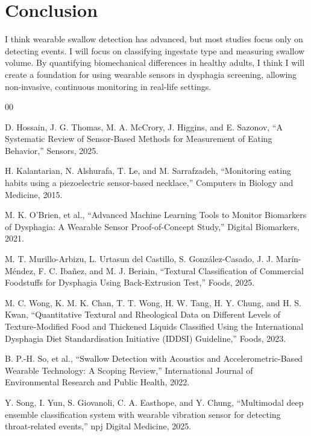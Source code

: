 \documentclass[conference]{IEEEtran}
\begin{document}
\section{Conclusion}
I think wearable swallow detection has advanced, but most studies focus only on detecting events. I will focus on classifying ingestate type and measuring swallow volume. By quantifying biomechanical differences in healthy adults, I think I will create a foundation for using wearable sensors in dysphagia screening, allowing non-invasive, continuous monitoring in real-life settings.

\begin{thebibliography}{00}

D. Hossain, J. G. Thomas, M. A. McCrory, J. Higgins, and E. Sazonov, “A Systematic Review of Sensor-Based Methods for Measurement of Eating Behavior,” Sensors, 2025.

H. Kalantarian, N. Alshurafa, T. Le, and M. Sarrafzadeh, “Monitoring eating habits using a piezoelectric sensor-based necklace,” Computers in Biology and Medicine, 2015.

M. K. O’Brien, et al., “Advanced Machine Learning Tools to Monitor Biomarkers of Dysphagia: A Wearable Sensor Proof-of-Concept Study,” Digital Biomarkers, 2021.

M. T. Murillo-Arbizu, L. Urtasun del Castillo, S. González-Casado, J. J. Marín-Méndez, F. C. Ibañez, and M. J. Beriain, “Textural Classification of Commercial Foodstuffs for Dysphagia Using Back-Extrusion Test,” Foods, 2025.

M. C. Wong, K. M. K. Chan, T. T. Wong, H. W. Tang, H. Y. Chung, and H. S. Kwan, “Quantitative Textural and Rheological Data on Different Levels of Texture-Modified Food and Thickened Liquids Classified Using the International Dysphagia Diet Standardisation Initiative (IDDSI) Guideline,” Foods, 2023.

B. P.-H. So, et al., “Swallow Detection with Acoustics and Accelerometric-Based Wearable Technology: A Scoping Review,” International Journal of Environmental Research and Public Health, 2022.

Y. Song, I. Yun, S. Giovanoli, C. A. Easthope, and Y. Chung, “Multimodal deep ensemble classification system with wearable vibration sensor for detecting throat-related events,” npj Digital Medicine, 2025.

\end{thebibliography}
\end{document}
